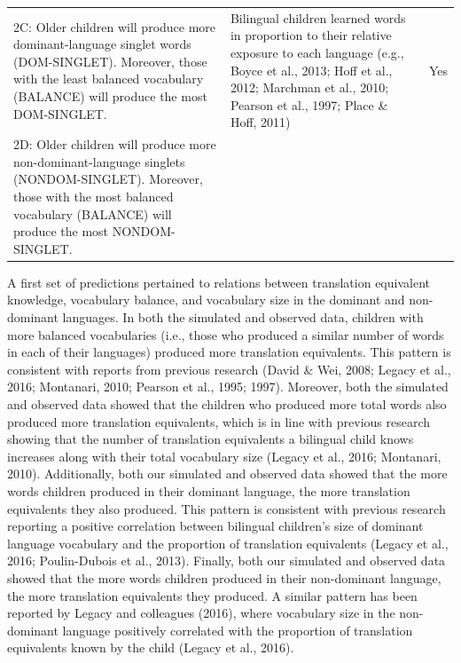 \documentclass[
  english,
  ,man,floatsintext]{apa6}
\begin{document}
\begin{landscape}
\begin{table}
\begin{tabular}[t]{>{\raggedright\arraybackslash}p{200px}>{\raggedright\arraybackslash}p{250px}>{\centering\arraybackslash}p{150px}}
\addlinespace
2C: Older children will produce more dominant-language singlet words (DOM-SINGLET). Moreover, those with the least balanced vocabulary (BALANCE) will produce the most DOM-SINGLET. & Bilingual children learned words in proportion to their relative exposure to each language (e.g., Boyce et al., 2013; Hoff et al., 2012; Marchman et al., 2010; Pearson et al., 1997; Place \& Hoff, 2011) & Yes\\
2D: Older children will produce more non-dominant-language singlets (NONDOM-SINGLET). Moreover, those with the most balanced vocabulary (BALANCE) will produce the most NONDOM-SINGLET. &  & \\
\bottomrule
\end{tabular}
\end{table}
\end{landscape}

A first set of predictions pertained to relations between translation equivalent knowledge, vocabulary balance, and vocabulary size in the dominant and non-dominant languages. In both the simulated and observed data, children with more balanced vocabularies (i.e., those who produced a similar number of words in each of their languages) produced more translation equivalents. This pattern is consistent with reports from previous research (David \& Wei, 2008; Legacy et al., 2016; Montanari, 2010; Pearson et al., 1995; 1997). Moreover, both the simulated and observed data showed that the children who produced more total words also produced more translation equivalents, which is in line with previous research showing that the number of translation equivalents a bilingual child knows increases along with their total vocabulary size (Legacy et al., 2016; Montanari, 2010). Additionally, both our simulated and observed data showed that the more words children produced in their dominant language, the more translation equivalents they also produced. This pattern is consistent with previous research reporting a positive correlation between bilingual children's size of dominant language vocabulary and the proportion of translation equivalents (Legacy et al., 2016; Poulin-Dubois et al., 2013). Finally, both our simulated and observed data showed that the more words children produced in their non-dominant language, the more translation equivalents they produced. A similar pattern has been reported by Legacy and colleagues (2016), where vocabulary size in the non-dominant language positively correlated with the proportion of translation equivalents known by the child (Legacy et al., 2016).
\end{document}
